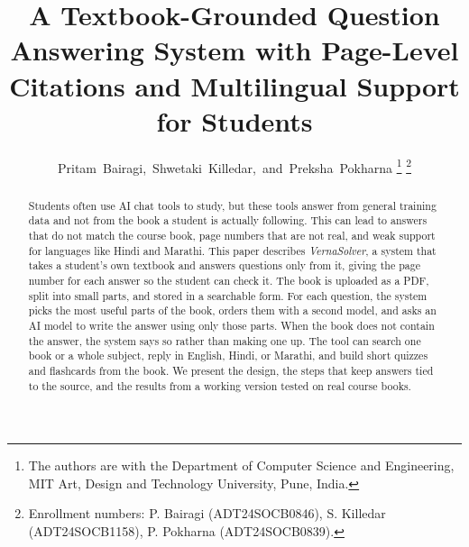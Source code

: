 \documentclass[journal]{IEEEtran}
\begin{document}
\title{A Textbook-Grounded Question Answering System with Page-Level
Citations and Multilingual Support for Students}

\author{Pritam~Bairagi,~Shwetaki~Killedar,~and~Preksha~Pokharna%
\thanks{The authors are with the Department of Computer Science and
Engineering, MIT Art, Design and Technology University, Pune, India.}%
\thanks{Enrollment numbers: P. Bairagi (ADT24SOCB0846),
S. Killedar (ADT24SOCB1158), P. Pokharna (ADT24SOCB0839).}}


\maketitle

\begin{abstract}
Students often use AI chat tools to study, but these tools answer from
general training data and not from the book a student is actually
following. This can lead to answers that do not match the course book,
page numbers that are not real, and weak support for languages like
Hindi and Marathi. This paper describes \textit{VernaSolver}, a system
that takes a student's own textbook and answers questions only from it,
giving the page number for each answer so the student can check it. The
book is uploaded as a PDF, split into small parts, and stored in a
searchable form. For each question, the system picks the most useful
parts of the book, orders them with a second model, and asks an AI model
to write the answer using only those parts. When the book does not
contain the answer, the system says so rather than making one up. The
tool can search one book or a whole subject, reply in English, Hindi, or
Marathi, and build short quizzes and flashcards from the book. We present
the design, the steps that keep answers tied to the source, and the
results from a working version tested on real course books.
\end{abstract}
\end{document}
